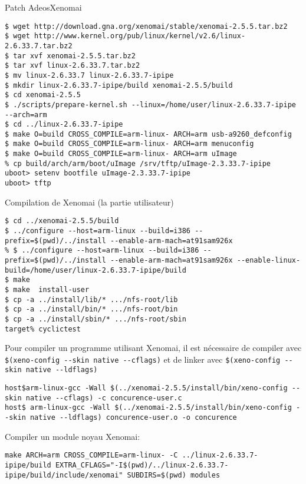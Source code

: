 \begin{frame}[fragile=singleslide]{Patch Adeos}{Xenomai}
  \begin{lstlisting}[basicstyle=\ttfamily\scriptsize\color{colBasic}]
$ wget http://download.gna.org/xenomai/stable/xenomai-2.5.5.tar.bz2
$ wget http://www.kernel.org/pub/linux/kernel/v2.6/linux-2.6.33.7.tar.bz2
$ tar xvf xenomai-2.5.5.tar.bz2 
$ tar xvf linux-2.6.33.7.tar.bz2
$ mv linux-2.6.33.7 linux-2.6.33.7-ipipe
$ mkdir linux-2.6.33.7-ipipe/build xenomai-2.5.5/build
$ cd xenomai-2.5.5
$ ./scripts/prepare-kernel.sh --linux=/home/user/linux-2.6.33.7-ipipe --arch=arm
$ cd ../linux-2.6.33.7-ipipe 
$ make O=build CROSS_COMPILE=arm-linux- ARCH=arm usb-a9260_defconfig
$ make O=build CROSS_COMPILE=arm-linux- ARCH=arm menuconfig
$ make O=build CROSS_COMPILE=arm-linux- ARCH=arm uImage
% cp build/arch/arm/boot/uImage /srv/tftp/uImage-2.3.33.7-ipipe
uboot> setenv bootfile uImage-2.3.33.7-ipipe
uboot> tftp
\end{lstlisting}
Compilation de Xenomai (la partie utilisateur)
  \begin{lstlisting}[basicstyle=\ttfamily\scriptsize\color{colBasic}]
$ cd ../xenomai-2.5.5/build
$ ../configure --host=arm-linux --build=i386 --prefix=$(pwd)/../install --enable-arm-mach=at91sam926x
% $ ../configure --host=arm-linux --build=i386 --prefix=$(pwd)/../install --enable-arm-mach=at91sam926x --enable-linux-build=/home/user/linux-2.6.33.7-ipipe/build
$ make
$ make  install-user
$ cp -a ../install/lib/* .../nfs-root/lib
$ cp -a ../install/bin/* .../nfs-root/bin
$ cp -a ../install/sbin/* .../nfs-root/sbin
target% cyclictest 
  \end{lstlisting} %
Pour compiler un programme utilisant Xenomai, il est nécessaire de compiler avec \verb+$(xeno-config --skin native --cflags)+ et de linker avec \verb+$(xeno-config --skin native --ldflags)+
  \begin{lstlisting}[basicstyle=\ttfamily\scriptsize\color{colBasic}]
host$arm-linux-gcc -Wall $(../xenomai-2.5.5/install/bin/xeno-config --skin native --cflags) -c concurence-user.c
host$ arm-linux-gcc -Wall $(../xenomai-2.5.5/install/bin/xeno-config --skin native --ldflags) concurence-user.o -o concurence
\end{lstlisting} %
Compiler un module noyau Xenomai:
\begin{lstlisting}
make ARCH=arm CROSS_COMPILE=arm-linux- -C ../linux-2.6.33.7-ipipe/build EXTRA_CFLAGS="-I$(pwd)/../linux-2.6.33.7-ipipe/build/include/xenomai" SUBDIRS=$(pwd) modules
\end{lstlisting} %
\end{frame}

